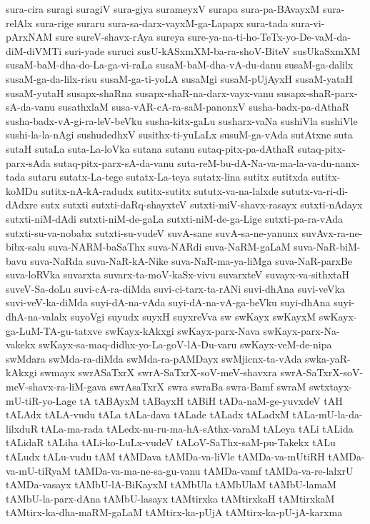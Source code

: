 {sura-cira
suragi
suragiV
sura-giya
surameyxV
surapa
sura-pa-BAvayxM
sura-relAlx
sura-rige
suraru
sura-sa-darx-vayxM-ga-Lapapx
sura-tada
sura-vi-pArxNAM
sure
sureV-shavx-rAya
sureya
sure-ya-na-ti-ho-TeTx-yo-De-vaM-da-diM-diVMTi
suri-yade
suruci
susU-kASxmXM-ba-ra-shoV-BiteV
susUkaSxmXM
susaM-baM-dha-do-La-ga-vi-raLa
susaM-baM-dha-vA-du-danu
susaM-ga-dalilx
susaM-ga-da-lilx-risu
susaM-ga-ti-yoLA
susaMgi
susaM-pUjAyxH
susaM-yataH
susaM-yutaH
susapx-shaRna
susapx-shaR-na-darx-vayx-vanu
susapx-shaR-parx-sA-da-vanu
susathxlaM
susa-vAR-cA-ra-saM-panonxV
susha-badx-pa-dAthaR
susha-badx-vA-gi-ra-leV-beVku
susha-kitx-gaLu
susharx-vaNa
sushiVla
sushiVle
sushi-la-la-nAgi
sushudedhxV
susithx-ti-yuLaLx
susuM-ga-vAda
sutAtxne
suta
sutaH
sutaLa
suta-La-loVka
sutana
sutanu
sutaq-pitx-pa-dAthaR
sutaq-pitx-parx-sAda
sutaq-pitx-parx-sA-da-vanu
suta-reM-bu-dA-Na-va-ma-la-va-du-nanx-tada
sutaru
sutatx-La-tege
sutatx-La-teya
sutatx-lina
sutitx
sutitxda
sutitx-koMDu
sutitx-nA-kA-radudx
sutitx-sutitx
sututx-va-na-lalxde
sututx-va-ri-di-dAdxre
sutx
sutxti
sutxti-daRq-shayxteV
sutxti-miV-shavx-rasayx
sutxti-nAdayx
sutxti-niM-dAdi
sutxti-niM-de-gaLa
sutxti-niM-de-ga-Lige
sutxti-pa-ra-vAda
sutxti-su-va-nobabx
sutxti-su-vudeV
suvA-sane
suvA-sa-ne-yanunx
suvAvx-ra-ne-bibx-salu
suva-NARM-baSaThx
suva-NARdi
suva-NaRM-gaLaM
suva-NaR-biM-bavu
suva-NaRda
suva-NaR-kA-Nike
suva-NaR-ma-ya-liMga
suva-NaR-parxBe
suva-loRVka
suvarxta
suvarx-ta-moV-kaSx-vivu
suvarxteV
suvayx-va-sithxtaH
suveV-Sa-doLu
suvi-cA-ra-diMda
suvi-ci-tarx-ta-rANi
suvi-dhAna
suvi-veVka
suvi-veV-ka-diMda
suyi-dA-na-vAda
suyi-dA-na-vA-ga-beVku
suyi-dhAna
suyi-dhA-na-valalx
suyoVgi
suyudx
suyxH
suyxreVva
sw
swKayx
swKayxM
swKayx-ga-LuM-TA-gu-tatxve
swKayx-kAkxgi
swKayx-parx-Nava
swKayx-parx-Na-vakekx
swKayx-sa-maq-didhx-yo-La-goV-lA-Du-varu
swKayx-veM-de-nipa
swMdara
swMda-ra-diMda
swMda-ra-pAMDayx
swMjicnx-ta-vAda
swka-yaR-kAkxgi
swmayx
swrASaTxrX
swrA-SaTxrX-soV-meV-shavxra
swrA-SaTxrX-soV-meV-shavx-ra-liM-gava
swrAsaTxrX
swra
swraBa
swra-Bamf
swraM
swtxtayx-mU-tiR-yo-Lage
tA
tABAyxM
tABayxH
tABiH
tADa-naM-ge-yuvxdeV
tAH
tALAdx
tALA-vudu
tALa
tALa-dava
tALade
tALadx
tALadxM
tALa-mU-la-da-lilxduR
tALa-ma-rada
tALedx-nu-ru-ma-hA-sAthx-varaM
tALeya
tALi
tALida
tALidaR
tALiha
tALi-ko-LuLx-vudeV
tALoV-SaThx-saM-pu-Takekx
tALu
tALudx
tALu-vudu
tAM
tAMDava
tAMDa-va-liVle
tAMDa-va-mUtiRH
tAMDa-va-mU-tiRyaM
tAMDa-va-ma-ne-sa-gu-vanu
tAMDa-vamf
tAMDa-va-re-lalxrU
tAMDa-vasayx
tAMbU-lA-BiKayxM
tAMbUla
tAMbUlaM
tAMbU-lamaM
tAMbU-la-parx-dAna
tAMbU-lasayx
tAMtirxka
tAMtirxkaH
tAMtirxkaM
tAMtirx-ka-dha-maRM-gaLaM
tAMtirx-ka-pUjA
tAMtirx-ka-pU-jA-karxma
}
